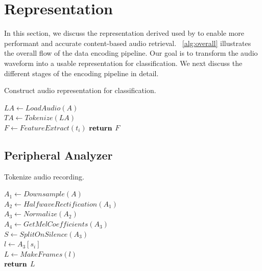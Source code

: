 \section{Representation}

In this section, we discuss the representation derived used by \sys to enable
more performant and accurate content-based audio retrieval.
%
~\cref{alg:overall} illustrates the overall flow of the data encoding pipeline.
%
Our goal is to transform the audio waveform into a usable representation for
classification.
%
We next discuss the different stages of the encoding pipeline in detail.

\begin{algorithm}[t!]
    \caption{Construct audio representation for classification.}
	\label{alg:overall}
    \SetAlgoLined
    
     {
        $LA \gets LoadAudio(A)$\\
        $TA \gets Tokenize(LA)$\\
         {
            $F \gets FeatureExtract(t_i)$
        }
        $\Return$ $F$
    }
\end{algorithm}

\subsection{Peripheral Analyzer}
\label{sec:analyzer}

\begin{algorithm}[t!]
    \caption{Tokenize audio recording.}\label{encoder}
    \SetAlgoLined
    
     {
        $A_1 \gets Downsample(A)$\\
        $A_2 \gets HalfwaveRectification(A_1)$\\
        $A_3 \gets Normalize(A_2)$\\
        $A_4 \gets GetMelCoefficients(A_3)$\\
        $S \gets SplitOnSilence(A_3)$\\
         {
            $l \gets A_3[s_i]$\\
            $L \gets MakeFrames(l)$\\
        }
        $\Return$ $L$
    }
\end{algorithm}

